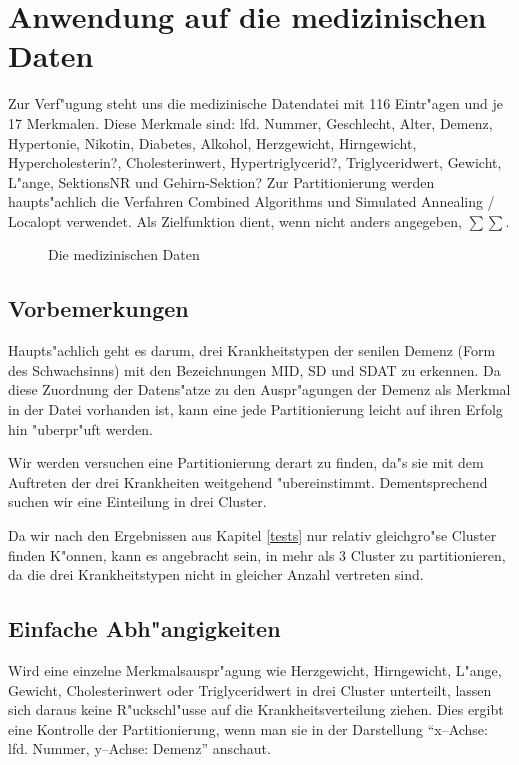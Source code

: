 \chapter{Anwendung auf die medizinischen Daten}
Zur Verf"ugung steht uns die medizinische Datendatei mit 116 Eintr"agen
und je 17 Merkmalen. Diese Merkmale sind: lfd. Nummer, Geschlecht, Alter,
Demenz, Hypertonie, Nikotin, Diabetes, Alkohol, Herzgewicht, Hirngewicht,
Hypercholesterin?, Cholesterinwert, Hypertriglycerid?, Triglyceridwert,
Gewicht, L"ange, SektionsNR und Gehirn-Sektion?
Zur Partitionierung werden haupts"achlich die Verfahren Combined
Algorithms und Simulated Annealing / Localopt verwendet. Als
Zielfunktion dient, wenn nicht anders angegeben, $\sum\sum$.

\begin{figure}[htbp]
\caption{Die medizinischen Daten}
\end{figure}

\section{Vorbemerkungen}
Haupts"achlich geht es darum, drei Krankheitstypen der senilen Demenz 
(Form des Schwachsinns) mit den Bezeichnungen MID, SD und SDAT zu erkennen.
Da diese Zuordnung der Datens"atze zu den Auspr"agungen der Demenz als
Merkmal in der Datei vorhanden ist, kann eine jede Partitionierung
leicht auf ihren Erfolg hin "uberpr"uft werden.

Wir werden versuchen eine Partitionierung derart zu finden, da"s sie
mit dem Auftreten der drei Krankheiten weitgehend "ubereinstimmt.
Dementsprechend suchen wir eine Einteilung in drei Cluster.

Da wir nach den Ergebnissen aus Kapitel \ref{tests} nur relativ gleichgro"se
Cluster finden K"onnen, kann es angebracht sein, in mehr als 3 Cluster
zu partitionieren, da die drei Krankheitstypen nicht in gleicher
Anzahl vertreten sind.


\section{Einfache Abh"angigkeiten}
Wird eine einzelne Merkmalsauspr"agung wie Herzgewicht, Hirngewicht, L"ange,
Gewicht, Cholesterinwert oder Triglyceridwert in drei Cluster unterteilt,
lassen sich daraus keine R"uckschl"usse auf die Krankheitsverteilung
ziehen. Dies ergibt eine Kontrolle der Partitionierung, wenn man sie in der
Darstellung "`x--Achse: lfd. Nummer, y--Achse: Demenz"' anschaut.

